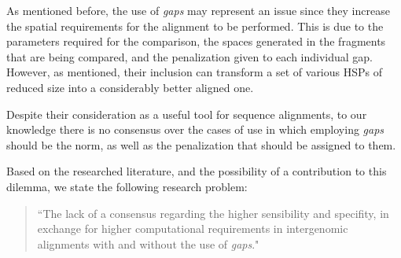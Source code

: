 \medskip

As mentioned before, the use of \textit{gaps} may represent an issue since they increase the spatial requirements for the alignment to be performed. This is due to the parameters required for the comparison, the spaces generated in the fragments that are being compared, and the penalization given to each individual gap. However, as mentioned, their inclusion can transform a set of various HSPs of reduced size into a considerably better aligned one. 

\medskip

Despite their consideration as a useful tool for sequence alignments, to our knowledge there is no consensus over the cases of use in which employing \textit{gaps} should be the norm, as well as the penalization that should be assigned to them.

\medskip

Based on the researched literature, and the possibility of a contribution to this dilemma, we state the following research problem:

\begin{quote}
  ``The lack of a consensus regarding the higher sensibility and specifity, in exchange for higher computational requirements in intergenomic alignments with and without the use of \textit{gaps}."
\end{quote}